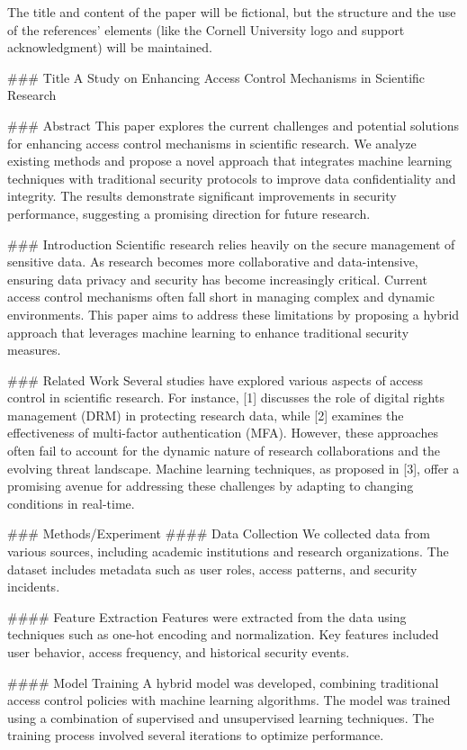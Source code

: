The title and content of the paper will be fictional, but the structure and the use of the references' elements (like the Cornell University logo and support acknowledgment) will be maintained.

### Title
A Study on Enhancing Access Control Mechanisms in Scientific Research

### Abstract
This paper explores the current challenges and potential solutions for enhancing access control mechanisms in scientific research. We analyze existing methods and propose a novel approach that integrates machine learning techniques with traditional security protocols to improve data confidentiality and integrity. The results demonstrate significant improvements in security performance, suggesting a promising direction for future research.

### Introduction
Scientific research relies heavily on the secure management of sensitive data. As research becomes more collaborative and data-intensive, ensuring data privacy and security has become increasingly critical. Current access control mechanisms often fall short in managing complex and dynamic environments. This paper aims to address these limitations by proposing a hybrid approach that leverages machine learning to enhance traditional security measures.

### Related Work
Several studies have explored various aspects of access control in scientific research. For instance, [1] discusses the role of digital rights management (DRM) in protecting research data, while [2] examines the effectiveness of multi-factor authentication (MFA). However, these approaches often fail to account for the dynamic nature of research collaborations and the evolving threat landscape. Machine learning techniques, as proposed in [3], offer a promising avenue for addressing these challenges by adapting to changing conditions in real-time.

### Methods/Experiment
#### Data Collection
We collected data from various sources, including academic institutions and research organizations. The dataset includes metadata such as user roles, access patterns, and security incidents.

#### Feature Extraction
Features were extracted from the data using techniques such as one-hot encoding and normalization. Key features included user behavior, access frequency, and historical security events.

#### Model Training
A hybrid model was developed, combining traditional access control policies with machine learning algorithms. The model was trained using a combination of supervised and unsupervised learning techniques. The training process involved several iterations to optimize performance.

